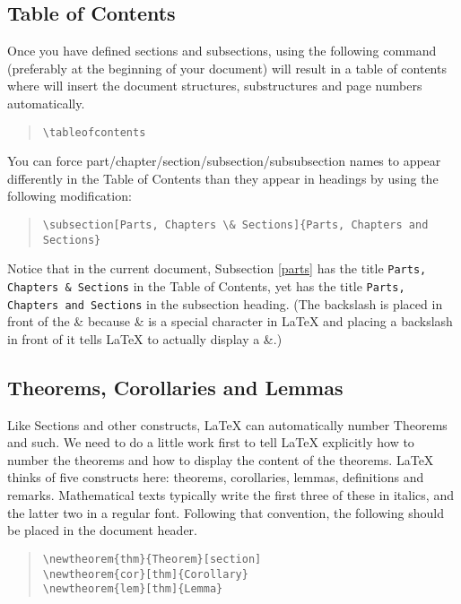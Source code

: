 \documentclass[letterpaper,twoside,10pt]{article}
\begin{document}
\subsection{Table of Contents}

Once you have defined sections and subsections, using the following command (preferably at the
beginning of your document) will result in a table of contents where {\LaTeXe} will insert the
document structures, substructures and page numbers automatically.

\begin{quote}
 \verb!\tableofcontents!
\end{quote}

You can force part/chapter/section/subsection/subsubsection names to appear differently in the Table
of Contents than they appear in headings by using the following modification:

\begin{quote}
 \verb!\subsection[Parts, Chapters \& Sections]{Parts, Chapters and Sections}!
\end{quote}

Notice that in the current document, Subsection \ref{parts} has the title \texttt{Parts, Chapters \&
Sections} in the Table of Contents, yet has the title \texttt{Parts, Chapters and Sections} in the
subsection heading. (The backslash is placed in front of the \& because \& is a special character in
{\LaTeX} and placing a backslash in front of it tells {\LaTeX} to actually display a \&.)

\subsection{Theorems, Corollaries and Lemmas}

Like Sections and other constructs, {\LaTeX} can automatically number Theorems and such. We need to
do a little work first to tell {\LaTeX} explicitly how to number the theorems and how to display the
content of the theorems. {\LaTeX} thinks of five constructs here: theorems, corollaries, lemmas,
definitions and remarks. Mathematical texts typically write the first three of these in italics, and
the latter two in a regular font. Following that convention, the following should be placed in the
document header.

\begin{quote}
\begin{verbatim}
\newtheorem{thm}{Theorem}[section]
\newtheorem{cor}[thm]{Corollary}
\newtheorem{lem}[thm]{Lemma}
\end{verbatim}
\end{quote}
\end{document}
